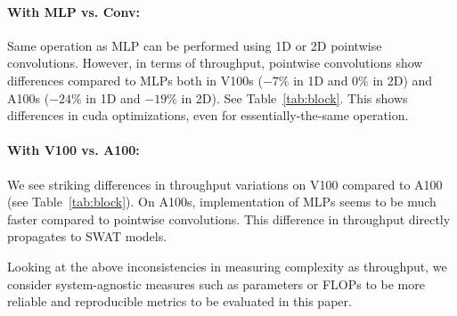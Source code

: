 \documentclass[10pt,twocolumn,letterpaper]{article}
\newcommand{\tref}[1]{Table~\ref{#1}}
\begin{document}
\paragraph{With MLP vs. Conv:} Same operation as MLP can be performed using 1D or 2D pointwise convolutions. However, in terms of throughput, pointwise convolutions show differences compared to MLPs both in V100s ($-7\%$ in 1D and $0\%$ in 2D) and A100s ($-24\%$ in 1D and $-19\%$ in 2D). See \tref{tab:block}. This shows differences in cuda optimizations, even for essentially-the-same operation.

\paragraph{With V100 vs. A100:} We see striking differences in throughput variations on V100 compared to A100 (see \tref{tab:block}). On A100s, implementation of MLPs seems to be much faster compared to pointwise convolutions. This difference in throughput directly propagates to SWAT models.

Looking at the above inconsistencies in measuring complexity as throughput, we consider system-agnostic measures such as parameters or FLOPs to be more reliable and reproducible metrics to be evaluated in this paper.

{\small
\balance


}
\end{document}
